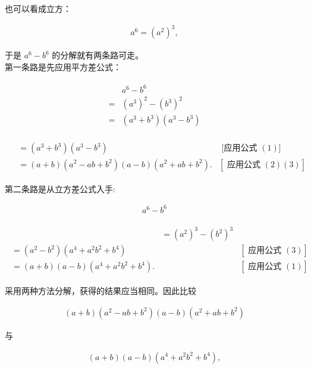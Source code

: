 \documentclass[10pt]{article}
\begin{document}
也可以看成立方：

\begin{align*}
a^{6}=\left(a^{2}\right)^{3},
\end{align*}

于是 $a^{6}-b^{6}$ 的分解就有两条路可走。\\
第一条路是先应用平方差公式：

\begin{align*}
\begin{aligned}
& a^{6}-b^{6} \\
= & \left(a^{3}\right)^{2}-\left(b^{3}\right)^{2} \\
= & \left(a^{3}+b^{3}\right)\left(a^{3}-b^{3}\right)
\end{aligned}
\end{align*}

\begin{align*}
\begin{array}{lrl} 
& =\left(a^{3}+b^{3}\right)\left(a^{3}-b^{3}\right) & \text { [应用公式 }(1)] \\
& =(a+b)\left(a^{2}-a b+b^{2}\right)(a-b)\left(a^{2}+a b+b^{2}\right) . & {[\text { 应用公式 }(2)(3)]}
\end{array}
\end{align*}

第二条路是从立方差公式入手:

\begin{align*}
a^{6}-b^{6}
\end{align*}

\begin{align*}
\begin{array}{llrl} 
& =\left(a^{2}\right)^{3}-\left(b^{2}\right)^{3} & & \\
=\left(a^{2}-b^{2}\right)\left(a^{4}+a^{2} b^{2}+b^{4}\right) & & {[\text { 应用公式 }(3)]} \\
=(a+b)(a-b)\left(a^{4}+a^{2} b^{2}+b^{4}\right) . & & {[\text { 应用公式 }(1)]}
\end{array}
\end{align*}

采用两种方法分解，获得的结果应当相同。因此比较

\begin{align*}
(a+b)\left(a^{2}-a b+b^{2}\right)(a-b)\left(a^{2}+a b+b^{2}\right)
\end{align*}

与

\begin{align*}
(a+b)(a-b)\left(a^{4}+a^{2} b^{2}+b^{4}\right),
\end{align*}
\end{document}
